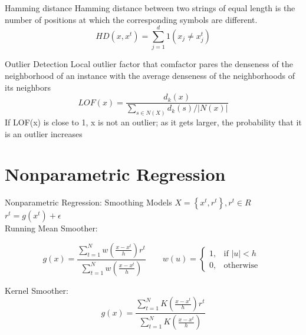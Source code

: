 \documentclass{beamer}
\begin{document}
\begin{frame}[fragile]{Hamming distance}
Hamming distance between two strings of equal length is the number of positions at which the corresponding symbols are different.
	\begin{equation}
		HD(x,x^t)=\sum_{j=1}^{d}1(x_j\neq x^{t}_{j})
	\end{equation} 
\end{frame}
\begin{frame}[fragile]{Outlier Detection}
Local outlier factor that comfactor pares the denseness of the neighborhood of an instance with the average
denseness of the neighborhoods of its neighbors 
\begin{equation}
LOF(x)=\frac{d_k(x)}{\sum_{s\in N(X)}d_k(s)/|N(x)|}
\end{equation} 
If LOF(x) is close to 1, x is not an outlier; as it gets larger, the probability that it is an outlier increases 
\end{frame}


\section{Nonparametric Regression}
\begin{frame}[fragile]{Nonparametric Regression: Smoothing Models}
 $X=\left\{x^t,r^t\right\}, r^t\in R$ \\
$r^t=g(x^t)+\epsilon$\\

Running Mean Smoother:

\begin{equation}
g(x)=\frac{\sum_{t=1}^{N}w\left(\frac{x-x^t}{h}\right)r^t}{\sum_{t=1}^{N}w\left(\frac{x-x^t}{h}\right)}
 \qquad
w(u)=\begin{cases} 1, & \mbox{if } |u|<h \\ 0, & \mbox{otherwise } \end{cases}
\end{equation} 

Kernel Smoother:
\begin{equation}
g(x)=\frac{\sum_{t=1}^{N}K\left(\frac{x-x^t}{h}\right)r^t}{\sum_{t=1}^{N}K\left(\frac{x-x^t}{h}\right)}
\end{equation} 
\end{frame}
\end{document}
